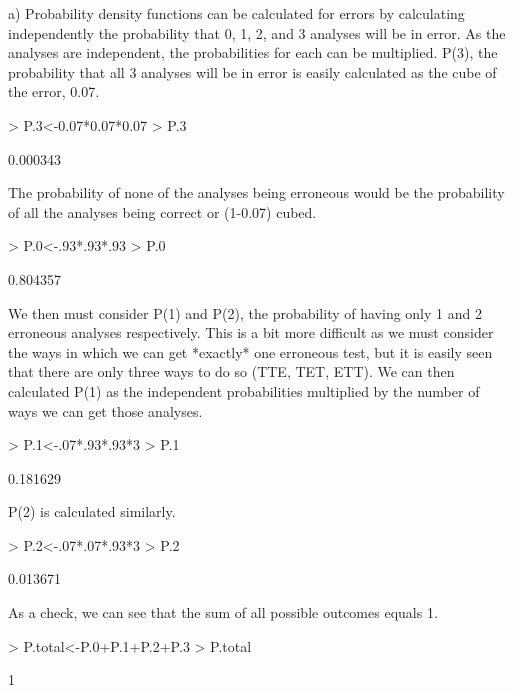 \documentclass[12pt,letterpaper]{article}
\begin{document}
{a) Probability density functions can be calculated for errors by calculating independently the probability that 0, 1, 2, and 3 analyses will be in error.  As the analyses are independent, the probabilities for each can be multiplied.  P(3), the probability that all 3 analyses will be in error is easily calculated as the cube of the error, 0.07.
\begin{Schunk}
\begin{Sinput}
> P.3<-0.07*0.07*0.07
> P.3
\end{Sinput}
\begin{Soutput}
[1] 0.000343
\end{Soutput}
\end{Schunk}

The probability of none of the analyses being erroneous would be the probability of all the analyses being correct or (1-0.07) cubed.
\begin{Schunk}
\begin{Sinput}
> P.0<-.93*.93*.93
> P.0
\end{Sinput}
\begin{Soutput}
[1] 0.804357
\end{Soutput}
\end{Schunk}

We then must consider P(1) and P(2), the probability of having only 1 and 2 erroneous analyses respectively.  This is a bit more difficult as we must consider the ways in which we can get *exactly* one erroneous test, but it is easily seen that there are only three ways to do so (TTE, TET, ETT). We can then calculated P(1) as the independent probabilities multiplied by the number of ways we can get those analyses.
\begin{Schunk}
\begin{Sinput}
> P.1<-.07*.93*.93*3
> P.1
\end{Sinput}
\begin{Soutput}
[1] 0.181629
\end{Soutput}
\end{Schunk}

P(2) is calculated similarly.
\begin{Schunk}
\begin{Sinput}
> P.2<-.07*.07*.93*3
> P.2
\end{Sinput}
\begin{Soutput}
[1] 0.013671
\end{Soutput}
\end{Schunk}


As a check, we can see that the sum of all possible outcomes equals 1.
\begin{Schunk}
\begin{Sinput}
> P.total<-P.0+P.1+P.2+P.3
> P.total
\end{Sinput}
\begin{Soutput}
[1] 1
\end{Soutput}
\end{Schunk}


}
\end{document}
